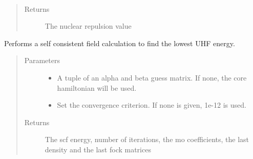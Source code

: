 \documentclass[letterpaper,10pt,english]{sphinxmanual}
\begin{document}
\begin{fulllineitems}
\begin{fulllineitems}
\end{fulllineitems}


\begin{fulllineitems}
\label{\detokenize{UHF:ghf.UHF.UHF.nuc_rep}}~\begin{quote}\begin{description}
\item[{Returns}] \leavevmode
The nuclear repulsion value

\end{description}\end{quote}

\end{fulllineitems}


\begin{fulllineitems}
\label{\detokenize{UHF:ghf.UHF.UHF.scf}}
Performs a self consistent field calculation to find the lowest UHF energy.
\begin{quote}\begin{description}
\item[{Parameters}] \leavevmode\begin{itemize}
\item {} 
 \textendash{} A tuple of an alpha and beta guess matrix. If none, the core hamiltonian will be used.

\item {} 
 \textendash{} Set the convergence criterion. If none is given, 1e-12 is used.

\end{itemize}

\item[{Returns}] \leavevmode
The scf energy, number of iterations, the mo coefficients, the last density and the last fock matrices

\end{description}\end{quote}

\end{fulllineitems}


\end{fulllineitems}
\end{document}
